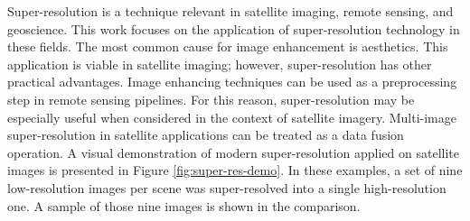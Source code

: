 Super-resolution is a technique relevant in satellite imaging,
remote sensing, and geoscience.
This work focuses on the application of super-resolution technology in these fields.
The most common cause for image enhancement is aesthetics.
This application is viable in satellite imaging; however, super-resolution has other practical advantages.
Image enhancing techniques can be used as a preprocessing step in remote
sensing pipelines.
For this reason, super-resolution may be especially useful when considered in
the context of satellite imagery.
Multi-image super-resolution in satellite applications can be treated as a data fusion operation.
A visual demonstration of modern super-resolution applied on satellite images is presented in Figure \ref{fig:super-res-demo}.
In these examples, a set of nine low-resolution images per scene was super-resolved into a single high-resolution one.
A sample of those nine images is shown in the comparison.
